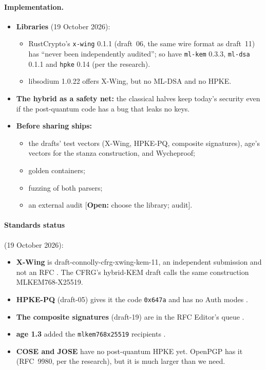 \documentclass[11pt,a4paper]{article}
\newcommand{\todo}[1]{\textcolor{red!70!black}{[\textbf{Open:} #1]}}
\begin{document}
\paragraph{Implementation.}
\begin{itemize}
  \item \textbf{Libraries} (19 October 2026):
  \begin{itemize}
    \item RustCrypto's \texttt{x-wing} 0.1.1 (draft~06, the same wire format as draft~11) has ``never been independently audited''; so have \texttt{ml-kem} 0.3.3, \texttt{ml-dsa} 0.1.1 and \texttt{hpke} 0.14 (per the research).
    \item libsodium 1.0.22 offers X-Wing, but no ML-DSA and no HPKE.
  \end{itemize}
  \item \textbf{The hybrid as a safety net:} the classical halves keep today's security even if the post-quantum code has a bug that leaks no keys.
  \item \textbf{Before sharing ships:}
  \begin{itemize}
    \item the drafts' test vectors (X-Wing, HPKE-PQ, composite signatures), age's vectors for the stanza construction, and Wycheproof;
    \item golden containers;
    \item fuzzing of both parsers;
    \item an external audit \todo{choose the library; audit}.
  \end{itemize}
\end{itemize}

\paragraph{Standards status} (19 October 2026):
\begin{itemize}
  \item \textbf{X-Wing} is draft-connolly-cfrg-xwing-kem-11, an independent submission and not an RFC \cite{xwingdraft}. The CFRG's hybrid-KEM draft calls the same construction MLKEM768-X25519.
  \item \textbf{HPKE-PQ} (draft-05) gives it the code \texttt{0x647a} and has no Auth modes \cite{hpkepq}.
  \item \textbf{The composite signatures} (draft-19) are in the RFC Editor's queue \cite{compsig}.
  \item \textbf{age 1.3} added the \texttt{mlkem768x25519} recipients \cite{age}.
  \item \textbf{COSE and JOSE} have no post-quantum HPKE yet. OpenPGP has it (RFC~9980, per the research), but it is much larger than we need.
\end{itemize}
\end{document}
